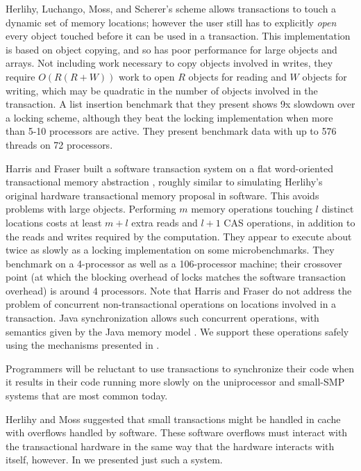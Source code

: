 Herlihy, Luchango, Moss, and Scherer's scheme \cite{HerlihyLuMoSc03}
allows transactions to touch a dynamic set of memory locations;
however the user still has to explicitly \emph{open} every object touched
before it can be used in a transaction.  This implementation is based
on object copying, and so has poor performance for large objects and
arrays.  Not including work necessary to copy objects involved in
writes, they require $O(R(R+W))$ work to open $R$ objects for reading
and $W$ objects for writing, which may be quadratic in the number of objects
involved in the transaction.   A list insertion benchmark that they
present shows 9x slowdown over a locking scheme, although they beat the locking
implementation when more than 5-10 processors are active.  They
present benchmark data with up to 576 threads on 72 processors.

Harris and Fraser built a software transaction system on a flat
word-oriented transactional memory abstraction \cite{HarrisFr03},
roughly similar to simulating Herlihy's original hardware
transactional memory proposal in software.  This avoids problems with
large objects.  Performing $m$ memory operations touching $l$ distinct
locations costs at least $m+l$ extra reads and $l+1$ CAS operations, in
addition to the reads and writes required by the computation.
They appear to execute about twice as slowly as a locking
implementation on some microbenchmarks.  They benchmark on a
4-processor as well as a 106-processor machine; their crossover point
(at which the blocking overhead of locks matches the software
transaction overhead) is around 4 processors.
Note that Harris and Fraser do not address the problem of
concurrent non-transactional operations on locations involved in a
transaction.  Java synchronization allows such concurrent operations,
with semantics given by the Java memory model \cite{MansonPu01a,MansonPu01b,MansonPuAd05}.
We support these operations safely using the mechanisms presented in
.

Programmers will be reluctant to use transactions to synchronize their
code when it results in their code running more slowly on the uniprocessor
and small-SMP systems that are most common today.

Herlihy and Moss \cite{HerlihyMo93} suggested that small transactions
might be handled in cache with overflows handled by software.  These
software overflows must interact with the transactional hardware in
the same way that the hardware interacts with itself, however.
In  we presented just such a system.


